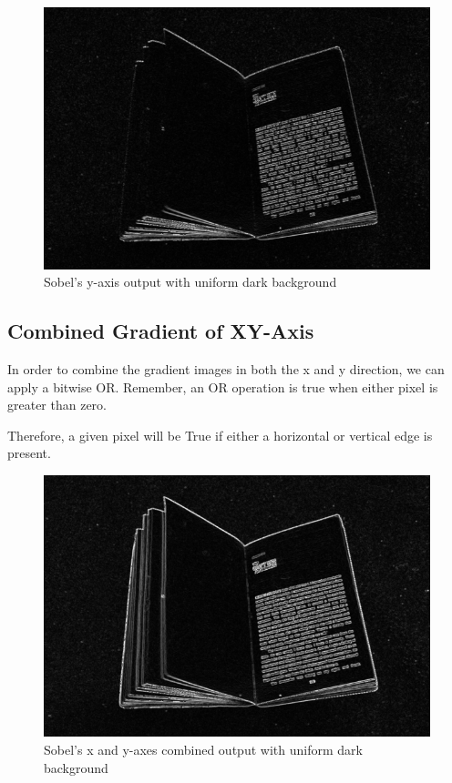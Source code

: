 \documentclass[BTech]{srmuthesis}
\begin{document}
\begin{figure}[h!]
    \centering
    \includegraphics[width=13.5cm\textwidth]{sobely_640x480}
    \caption{Sobel's y-axis output with uniform dark background}
    \label{fig:Sobel's y-axis with uniform dark background}
\end{figure}


\newpage

\subsection{Combined Gradient of XY-Axis}

In order to combine the gradient images in both the x and y direction, we can apply a bitwise OR. Remember, an OR operation is true when either pixel is greater than zero. 

Therefore, a given pixel will be True if either a horizontal or vertical edge is present.

\begin{figure}[h!]
    \centering
    \includegraphics[width=15cm\textwidth]{sobel_xy_combined_640x480}
    \caption{Sobel's x and y-axes combined output with uniform dark background}
    \label{fig:Sobel's x and y-axes combined output with uniform dark background}
\end{figure}
\end{document}
